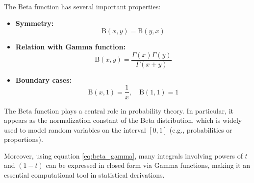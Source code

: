 The Beta function has several important properties:

\begin{itemize}
	\item \textbf{Symmetry:}
	\[
	\mathrm{B}(x,y) = \mathrm{B}(y,x)
	\]
	
	\item \textbf{Relation with Gamma function:}
	\begin{equation}\label{eq:beta_gamma}
		\mathrm{B}(x,y) = \frac{\Gamma(x)\Gamma(y)}{\Gamma(x+y)}
	\end{equation}
	
	\item \textbf{Boundary cases:}
	\[
	\mathrm{B}(x,1) = \frac{1}{x}, \quad \mathrm{B}(1,1)=1
	\]
\end{itemize}

The Beta function plays a central role in probability theory. In particular, it appears as the normalization constant of the Beta distribution, which is widely used to model random variables on the interval $[0,1]$ (e.g., probabilities or proportions).

Moreover, using equation \eqref{eq:beta_gamma}, many integrals involving powers of $t$ and $(1-t)$ can be expressed in closed form via Gamma functions, making it an essential computational tool in statistical derivations.